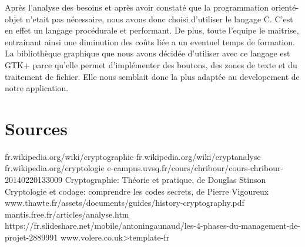 \documentclass[a4]{article}
\begin{document}
			
			 Après l'analyse des besoins et après avoir constaté que la programmation orienté-objet n'etait pas nécessaire, nous avons donc choisi d'utiliser le langage C.
			C'est en effet un langage procédurale et performant.
			De plus, toute l'equipe le maitrise, entrainant ainsi une diminution des coûts liée a un eventuel temps de formation.
			La bibliothèque graphique que nous avons décidée d'utiliser avec ce langage est GTK+ parce qu'elle permet d'implémenter des boutons, des zones de texte et du traitement de fichier.
			Elle nous semblait donc la plus adaptée au developement de notre application.
			 
			\section{Sources}

fr.wikipedia.org/wiki/cryptographie
fr.wikipedia.org/wiki/cryptanalyse
fr.wikipedia.org/cryptologie
e-campus.uvsq.fr/cours/chribour/cours-chribour-20140220133009
Cryptographie: Théorie et pratique, de Douglas Stinson
Cryptologie et codage: comprendre les codes secrets, de Pierre Vigoureux
www.thawte.fr/assets/documents/guides/history-cryptography.pdf
mantis.free.fr/articles/analyse.htm
https://fr.slideshare.net/mobile/antoningaunaud/les-4-phases-du-management-de-projet-2889991
www.volere.co.uk>template-fr
\end{document}
